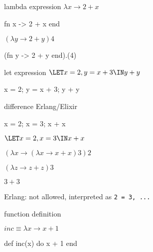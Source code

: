 \begin{frame}{lambda expression}
  $\lambda x \rightarrow 2 + x$
  \pause

  \begin{code}
   fn x -> 2 + x end
  \end{code}
  \pause
  $(\lambda y \rightarrow 2 + y) 4$
  \pause  
  \begin{code}
    (fn y -> 2 + y end).(4)
  \end{code}
\end{frame}


\begin{frame}{let expression}
  $\LET x = 2, y = x + 3 \IN y + y $
  \pause

  \begin{code}
    x = 2;  y = x + 3;  y + y
  \end{code}


\end{frame}

\begin{frame}{difference Erlang/Elixir}

  \begin{code}
    x = 2; x = 3; x + x
  \end{code}

  \vspace{10pt}\pause
  $\LET x = 2, x = 3 \IN x + x $

  \vspace{10pt}\pause
  $(\lambda x \rightarrow ( \lambda x \rightarrow x + x) 3 ) 2$  

  \vspace{10pt}\pause
  $( \lambda z \rightarrow z + z) 3$

  \vspace{10pt}\pause
  $3 + 3$  
  


  \vspace{30pt}\pause
  Erlang: not allowed, interpreted as {\tt 2 = 3, ...}
  
\end{frame}


\begin{frame}{function definition}

  $inc \equiv \lambda x \rightarrow x + 1$
  \pause

  \begin{code}
    def inc(x) do
       x + 1
    end 
  \end{code}

\end{frame}

